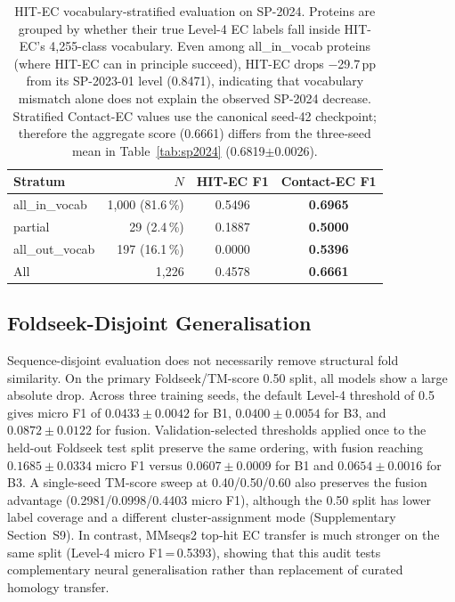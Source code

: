 \documentclass[numbered,contemporary,mediumone]{oup-authoring-template}
\begin{document}
\begin{table}[!htbp]
\centering
\caption{HIT-EC vocabulary-stratified evaluation on SP-2024. Proteins are
grouped by whether their true Level-4 EC labels fall inside HIT-EC's
4{,}255-class vocabulary. Even among all\_in\_vocab proteins (where HIT-EC
can in principle succeed), HIT-EC drops $-$29.7\,pp from its SP-2023-01
level (0.8471), indicating that vocabulary mismatch alone does not explain
the observed SP-2024 decrease. Stratified Contact-EC values use the canonical
seed-42 checkpoint; therefore the aggregate score (0.6661) differs from the
three-seed mean in Table~\ref{tab:sp2024} (0.6819$\pm$0.0026).}
\label{tab:vocab_strat}
\setlength{\tabcolsep}{4pt}
\begin{tabular}{lrcc}
\toprule
Stratum & $N$ & HIT-EC F1 & Contact-EC F1 \\
\midrule
all\_in\_vocab  & 1{,}000 (81.6\,\%) & 0.5496 & \textbf{0.6965} \\
partial         &    29  (2.4\,\%)  & 0.1887 & \textbf{0.5000} \\
all\_out\_vocab &   197  (16.1\,\%) & 0.0000 & \textbf{0.5396} \\
\midrule
All             & 1{,}226           & 0.4578 & \textbf{0.6661} \\
\bottomrule
\end{tabular}
\end{table}
\FloatBarrier

\subsection{Foldseek-Disjoint Generalisation}

Sequence-disjoint evaluation does not necessarily remove structural fold
similarity. On the primary Foldseek/TM-score 0.50 split, all models show a large
absolute drop. Across three training seeds, the default Level-4 threshold of 0.5
gives micro F1 of $0.0433\pm0.0042$ for B1, $0.0400\pm0.0054$ for B3, and
$0.0872\pm0.0122$ for fusion. Validation-selected thresholds applied once to the
held-out Foldseek test split preserve the same ordering, with fusion reaching
$0.1685\pm0.0334$ micro F1 versus $0.0607\pm0.0009$ for B1 and
$0.0654\pm0.0016$ for B3. A single-seed TM-score sweep at 0.40/0.50/0.60 also
preserves the fusion advantage (0.2981/0.0998/0.4403 micro F1), although the
0.50 split has lower label coverage and a different cluster-assignment mode
(Supplementary Section~S9). In contrast, MMseqs2 top-hit EC transfer is much
stronger on the same split (Level-4 micro F1\,=\,0.5393), showing that this audit
tests complementary neural generalisation rather than replacement of curated
homology transfer.
\end{document}
